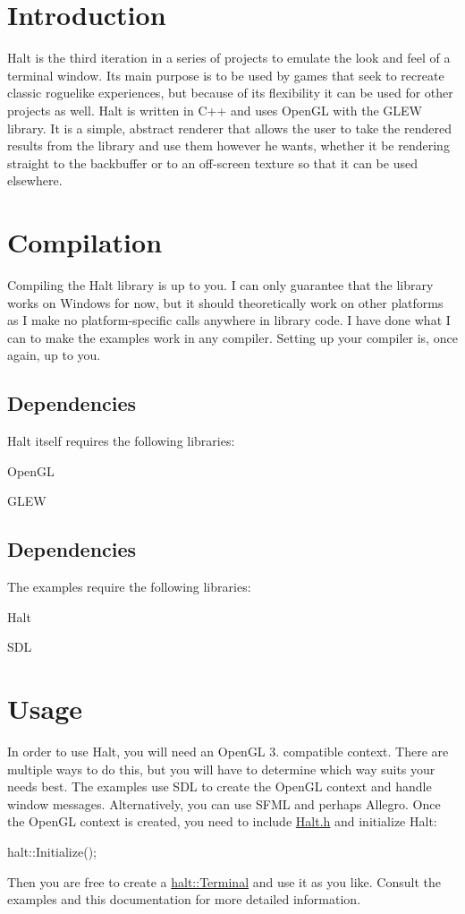 \hypertarget{index_Introduction}{}\section{\-Introduction}\label{index_Introduction}
\-Halt is the third iteration in a series of projects to emulate the look and feel of a terminal window. \-Its main purpose is to be used by games that seek to recreate classic roguelike experiences, but because of its flexibility it can be used for other projects as well. \-Halt is written in \-C++ and uses \-Open\-G\-L with the \-G\-L\-E\-W library. \-It is a simple, abstract renderer that allows the user to take the rendered results from the library and use them however he wants, whether it be rendering straight to the backbuffer or to an off-\/screen texture so that it can be used elsewhere.\hypertarget{index_Compilation}{}\section{\-Compilation}\label{index_Compilation}
\-Compiling the \-Halt library is up to you. \-I can only guarantee that the library works on \-Windows for now, but it should theoretically work on other platforms as \-I make no platform-\/specific calls anywhere in library code. \-I have done what \-I can to make the examples work in any compiler. \-Setting up your compiler is, once again, up to you.\hypertarget{index_Library}{}\subsection{\-Dependencies}\label{index_Library}
\-Halt itself requires the following libraries\-: \begin{DoxyItemize}
\item \-Open\-G\-L \item \-G\-L\-E\-W\end{DoxyItemize}
\hypertarget{index_Example}{}\subsection{\-Dependencies}\label{index_Example}
\-The examples require the following libraries\-: \begin{DoxyItemize}
\item \-Halt \item \-S\-D\-L\end{DoxyItemize}
\hypertarget{index_Usage}{}\section{\-Usage}\label{index_Usage}
\-In order to use \-Halt, you will need an \-Open\-G\-L 3. compatible context. \-There are multiple ways to do this, but you will have to determine which way suits your needs best. \-The examples use \-S\-D\-L to create the \-Open\-G\-L context and handle window messages. \-Alternatively, you can use \-S\-F\-M\-L and perhaps \-Allegro. \-Once the \-Open\-G\-L context is created, you need to include \hyperlink{_halt_8h_source}{\-Halt.\-h} and initialize \-Halt\-:

halt\-::\-Initialize();

\-Then you are free to create a \hyperlink{classhalt_1_1_terminal}{halt\-::\-Terminal} and use it as you like. \-Consult the examples and this documentation for more detailed information. 
